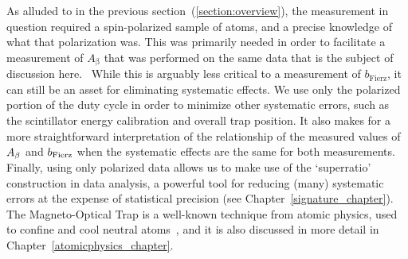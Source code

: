 % 
As alluded to in the previous section~(\ref{section:overview}), the measurement in question required a spin-polarized sample of atoms, and a precise knowledge of what that polarization was.  This was primarily needed in order to facilitate a measurement of $A_{\mathrm{\beta}}$  that was performed on the same data that is the subject of discussion here.~\cite{ben_Abeta}   
While this is arguably less critical to a measurement of $b_{\mathrm{Fierz}}$, it can still be an asset for eliminating systematic effects.    
We use only the polarized portion of the duty cycle in order to minimize other systematic errors, such as the scintillator energy calibration and overall trap position.  It also makes for a more straightforward interpretation of the relationship of the measured values of $A_{\beta}$ and $b_{\mathrm{Fierz}}$ when the systematic effects are the same for both measurements. Finally, using only polarized data allows us to make use of the `superratio' construction in data analysis, a powerful tool for reducing (many) systematic errors at the expense of statistical precision (see Chapter~\ref{signature_chapter}).
% 
The Magneto-Optical Trap is a well-known technique from atomic physics, used to confine and cool neutral atoms~\cite{raabprentiss}, and it is also discussed in more detail in Chapter~\ref{atomicphysics_chapter}.

